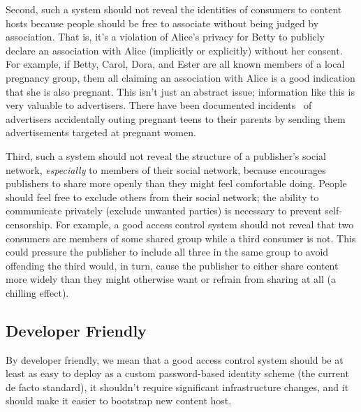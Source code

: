 \documentclass[pdftex,12pt,a4papaer]{report}
\begin{document}
Second, such a system should not reveal the identities of consumers to content
hosts because people should be free to associate without being judged by
association. That is, it's a violation of Alice's privacy for Betty to publicly
declare an association with Alice (implicitly or explicitly) without her
consent. For example, if Betty, Carol, Dora, and Ester are all known members of
a local pregnancy group, them all claiming an association with Alice is a good
indication that she is also pregnant. This isn't just an abstract issue;
information like this is very valuable to advertisers. There have been
documented incidents~\cite{target} of advertisers accidentally outing pregnant
teens to their parents by sending them advertisements targeted at pregnant
women.

Third, such a system should not reveal the structure of a publisher's social
network, \emph{especially} to members of their social network, because
encourages publishers to share more openly than they might feel comfortable
doing. People should feel free to exclude
others from their social network; the ability to communicate privately (exclude
unwanted parties) is necessary to prevent self-censorship. For example, a good
access control system should not reveal that two consumers are members of some
shared group while a third consumer is not. This could pressure the publisher to
include all three in the same group to avoid offending the third would, in turn,
cause the publisher to either share content more widely than they might
otherwise want or refrain from sharing at all (a chilling effect).



\subsection{Developer Friendly}
\label{sub:goal-developer}

By developer friendly, we mean that a good access control system should be at
least as easy to deploy as a custom password-based identity scheme (the current
de facto standard), it shouldn't require significant infrastructure changes, and
it should make it easier to bootstrap new content host.
\end{document}
